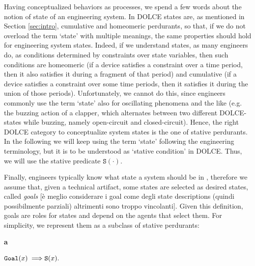 \documentclass[sw]{iosart2x}
\newcommand{\bflist}{\begin{list}{}{\setlength{\topsep}{2mm}\setlength{\partopsep}{0mm}\setlength{\parsep}{0mm}\setlength{\leftmargin}{9mm}\setlength{\labelwidth}{8mm}}}
\newcommand{\eflist}{\end{list}}
\newcommand{\AxLabel}{\textrm{a}}
\newcounter{cntax}
\newcommand{\myax}[1]{\refstepcounter{cntax}\begin{small}{\bf \AxLabel\thecntax\label{ax:#1}}\end{small}}
\newcommand{\generalStyle}[1]{\texttt{#1}}
\newcommand{\uniRel}[2]{\generalStyle{#1}(#2)}
\newcommand{\myfi}{\hspace{0.9mm} \Longrightarrow}
\newcommand{\DOLCE}{\textsc{DOLCE}\xspace} %
\newcommand{\DOLCEStative}[1]{\uniRel{{S}}{#1}}
\newcommand{\Goal}[1]{\uniRel{Goal}{#1}}
\newcommand{\firstTimeKeyWord}[1]{\textit{#1}}
\newcommand{\stateVarCond}[1]{%
  \ifthenelse{\equal{#1}{fullSingular}}{system condition}{%
    \ifthenelse{\equal{#1}{shortSingular}}{condition}{%
      \ifthenelse{\equal{#1}{fullPlural}}{system conditions}{%
        \ifthenelse{\equal{#1}{shortPlural}}{conditions}{%
          ERROR!%
        }%
      }%
    }%
  }%
}
\newcommand{\quotes}[1]{`#1'}
\newcommand{\TODO}[1]{{\color{red} #1}}
\begin{document}
Having conceptualized behaviors as processes, we spend a few words about the notion of state of an engineering system.
In \DOLCE states are, as mentioned in Section \ref{sec:intro}, cumulative and homeomeric perdurants, so that, if we do not overload the term \quotes{state} with multiple meanings, the same properties should hold for engineering system states.
Indeed, if we understand states, as many engineers do, as conditions determined by constraints over state variables, then such conditions are homeomeric (if a device satisfies a constraint over a time period, then it also satisfies it during a fragment of that period) and cumulative (if a device satisfies a constraint over some time periods, then it satisfies it during the union of those periods).
Unfortunately, we cannot do this, since engineers commonly use the term \quotes{state} also for oscillating phenomena and the like (e.g. the buzzing action of a clapper, which alternates between two different \DOLCE-states while buzzing, namely open-circuit and closed-circuit). 
Hence, the right \DOLCE category to conceptualize system states is the one of stative perdurants. 
In the following we will keep using the term \quotes{state} following the engineering terminology, but it is to be understood as \quotes{stative condition} in \DOLCE. Thus, we will use the stative predicate $\DOLCEStative{\cdot}$.

Finally, engineers typically know what state a system should be in
, therefore we assume that, given a technical artifact, some states are selected as desired states, called \firstTimeKeyWord{goals}\TODO{[è meglio considerare i goal come degli state descriptions (quindi possibilmente parziali) altrimenti sono troppo vincolanti]}.
Given this definition, goals are roles for states and depend on the agents that select them.
For simplicity, we represent them as a subclass of stative perdurants: 
\bflist
  \item[\myax{goalSubsum}] $ \Goal{x} \myfi \DOLCEStative{x}. $
\eflist

\end{document}

